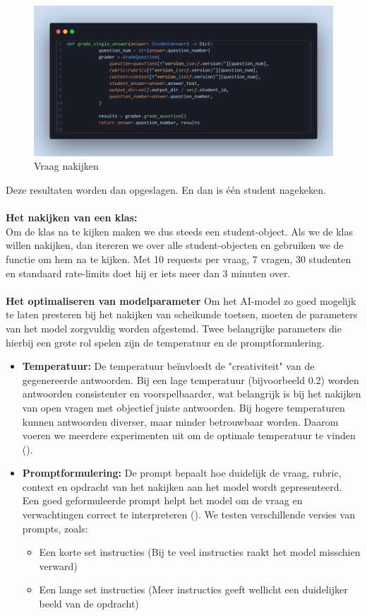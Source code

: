 \documentclass[12pt]{article}
\begin{document}
\begin{figure}[H] %
    \centering
    \includegraphics[width=0.8 \textwidth]{./images/methoden/nakijken/grade_question.png}
    \caption{Vraag nakijken}
    \label{fig:Vraag_nakijken}
\end{figure}
Deze resultaten worden dan opgeslagen. En dan is één student nagekeken.
\\ \\
\textbf{Het nakijken van een klas:}\\
Om de klas na te kijken maken we dus steeds een student-object. Als we de klas willen nakijken, dan itereren we over alle student-objecten en gebruiken we de functie om hem na te kijken. Met 10 requests per vraag, 7 vragen, 30 studenten en standaard rate-limits doet hij er iets meer dan 3 minuten over.
\\ \\
\textbf{Het optimaliseren van modelparameter}
Om het AI-model zo goed mogelijk te laten presteren bij het nakijken van scheikunde toetsen, moeten de parameters van het model zorgvuldig worden afgestemd. Twee belangrijke parameters die hierbij een grote rol spelen zijn de temperatuur en de promptformulering.

\begin{itemize} 
\item \textbf{Temperatuur:}
De temperatuur beïnvloedt de "creativiteit" van de gegenereerde antwoorden. Bij een lage temperatuur (bijvoorbeeld 0.2) worden antwoorden consistenter en voorspelbaarder, wat belangrijk is bij het nakijken van open vragen met objectief juiste antwoorden. Bij hogere temperaturen kunnen antwoorden diverser, maar minder betrouwbaar worden. Daarom voeren we meerdere experimenten uit om de optimale temperatuur te vinden (\cite{peeperkorn2024temperature}).
\item \textbf{Promptformulering:}  
De prompt bepaalt hoe duidelijk de vraag, rubric, context en opdracht van het nakijken aan het model wordt gepresenteerd. Een goed geformuleerde prompt helpt het model om de vraag en verwachtingen correct te interpreteren (\cite{qian2024long}). We testen verschillende versies van prompts, zoals:  
    \begin{itemize}  
        \item Een korte set instructies (Bij te veel instructies raakt het model misschien verward)
        \item Een lange set instructies (Meer instructies geeft wellicht een duidelijker beeld van de opdracht) 
    \end{itemize}
\end{itemize}
\end{document}
